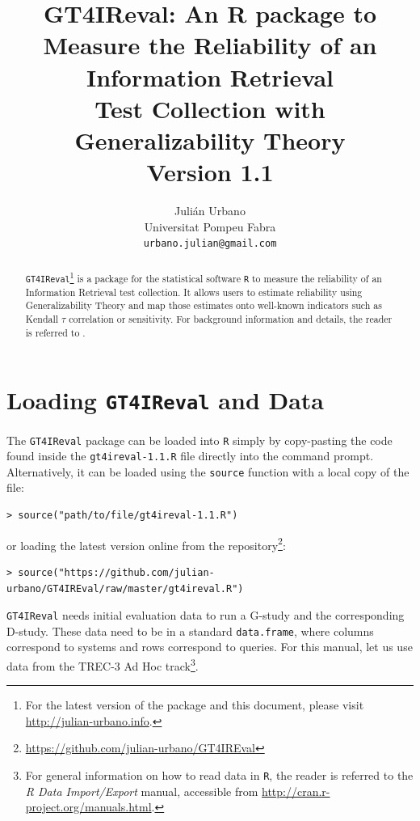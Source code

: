 \documentclass[twoside]{article}
\begin{document}
\title{\textbf{GT4IReval: An R package to Measure the Reliability of an Information Retrieval\\Test Collection with Generalizability Theory\\{\Large Version 1.1}}}
\author{Juli\'an Urbano\\Universitat Pompeu Fabra\\\texttt{urbano.julian@gmail.com}}
\maketitle

\begin{abstract}
\noindent\texttt{GT4IReval}\footnote{For the latest version of the package and this document, please visit \url{http://julian-urbano.info}.} is a package for the statistical software \texttt{R} to measure the reliability of an Information Retrieval test collection. It allows users to estimate reliability using Generalizability Theory and map those estimates onto well-known indicators such as Kendall $\tau$ correlation or sensitivity. For background information and details, the reader is referred to \cite{Urbano2013:measurement}.
\end{abstract}

\section{Loading \texttt{GT4IReval} and Data}

The \texttt{GT4IReval} package can be loaded into \texttt{R} simply by copy-pasting the code found inside the \texttt{gt4ireval-1.1.R} file directly into the command prompt. Alternatively, it can be loaded using the \texttt{source} function with a local copy of the file:
{\small\begin{verbatim}
> source("path/to/file/gt4ireval-1.1.R")
\end{verbatim}}
\noindent or loading the latest version online from the repository\footnote{\url{https://github.com/julian-urbano/GT4IREval}}:
{\small\begin{verbatim}
> source("https://github.com/julian-urbano/GT4IREval/raw/master/gt4ireval.R")
\end{verbatim}}

\texttt{GT4IReval} needs initial evaluation data to run a G-study and the corresponding D-study. These data need to be in a standard \texttt{data.frame}, where columns correspond to systems and rows correspond to queries. For this manual, let us use data from the TREC-3 Ad Hoc track\footnote{For general information on how to read data in \texttt{R}, the reader is referred to the \textsl{R Data Import/Export} manual, accessible from \url{http://cran.r-project.org/manuals.html}.}.
\end{document}
